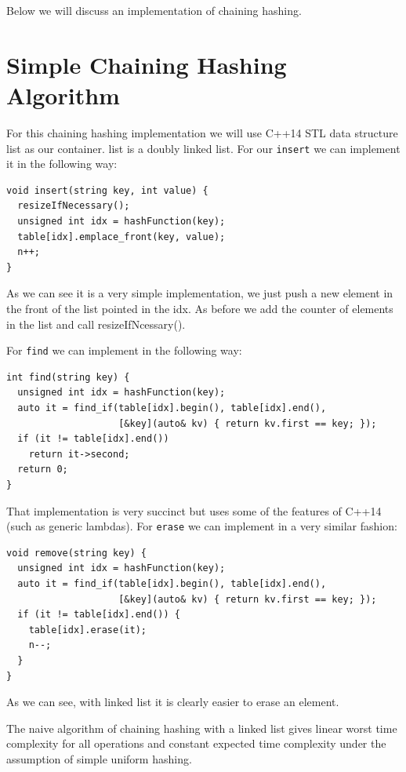 Below we will discuss an implementation of chaining hashing.

\section{Simple Chaining Hashing Algorithm}

For this chaining hashing implementation we will use C++14 STL data structure list as our container. list is a doubly linked list. For our \texttt{insert} we can implement it in the following way:

\begin{lstlisting}
void insert(string key, int value) {
  resizeIfNecessary();
  unsigned int idx = hashFunction(key);      
  table[idx].emplace_front(key, value);
  n++;
}
\end{lstlisting}

As we can see it is a very simple implementation, we just push a new element in the front of the list pointed in the idx. As before we add the counter of elements in the list and call resizeIfNcessary().

For \texttt{find} we can implement in the following way:

\begin{lstlisting}
int find(string key) {
  unsigned int idx = hashFunction(key);
  auto it = find_if(table[idx].begin(), table[idx].end(),
                    [&key](auto& kv) { return kv.first == key; });
  if (it != table[idx].end())
    return it->second;
  return 0;
}
\end{lstlisting}

That implementation is very succinct but uses some of the features of C++14 (such as generic lambdas). For \texttt{erase} we can implement in a very similar fashion:

\begin{lstlisting}
void remove(string key) {
  unsigned int idx = hashFunction(key);
  auto it = find_if(table[idx].begin(), table[idx].end(),
                    [&key](auto& kv) { return kv.first == key; });
  if (it != table[idx].end()) {
    table[idx].erase(it);
    n--;
  }
}
\end{lstlisting}

As we can see, with linked list it is clearly easier to erase an element. 

The naive algorithm of chaining hashing with a linked list gives linear worst time complexity for all operations and constant expected time complexity under the assumption of simple uniform hashing. 

